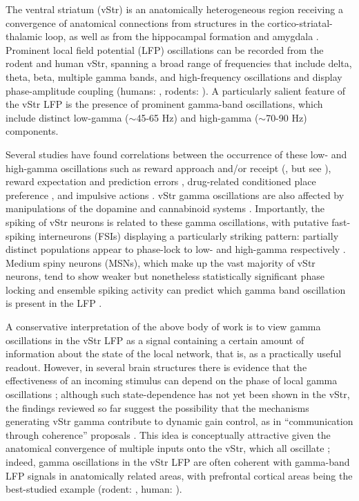 \documentclass[11pt]{article}
\let\cite=\citep
\let\citeNP=\citealt
\begin{document}
The ventral striatum (vStr) is an anatomically heterogeneous region
receiving a convergence of anatomical connections from structures in
the cortico-striatal-thalamic loop, as well as from the hippocampal
formation and amygdala
\cite{Pennartz94,Haber2009,Sesack2010}. Prominent local field
potential (LFP) oscillations can be recorded from the rodent and human
vStr, spanning a broad range of frequencies that include delta, theta,
beta, multiple gamma bands, and high-frequency oscillations
\cite{Berke2004a,VanderMeer2010b,Axmacher2010,Durschmid2013,Hunt2009a}
and display phase-amplitude coupling (humans: \citeNP{Cohen2009f},
rodents: \citeNP{Donnelly2014,Malhotra2015a}). A particularly salient
feature of the vStr LFP is the presence of prominent gamma-band
oscillations, which include distinct low-gamma ($\sim$45-65 Hz) and
high-gamma ($\sim$70-90 Hz) components.

Several studies have found correlations between the occurrence of
these low- and high-gamma oscillations such as reward approach and/or
receipt (\citeNP{Vandermeer2009a,Berke2009b}, but see
\citeNP{Malhotra2015a}), reward expectation and prediction errors
\cite{Cohen2009f,Axmacher2010}, drug-related conditioned place
preference \cite{Dejean2016}, and impulsive actions
\cite{Donnelly2014}. vStr gamma oscillations are also affected by
manipulations of the dopamine and cannabinoid systems
\cite{Berke2009b,Lemaire2012, Morra2012}. Importantly, the spiking of
vStr neurons is related to these gamma oscillations, with putative
fast-spiking interneurons (FSIs) displaying a particularly striking
pattern: partially distinct populations appear to phase-lock to low-
and high-gamma respectively \cite{Berke2005,Vandermeer2009a,
  Dejean2016}. Medium spiny neurons (MSNs), which make up the vast
majority of vStr neurons, tend to show weaker but nonetheless
statistically significant phase locking \cite{Kalenscher2010,Howe2011}
and ensemble spiking activity can predict which gamma band oscillation
is present in the LFP \cite{Catanese2016}.

 A conservative interpretation of the above body of work is to view
 gamma oscillations in the vStr LFP as a signal containing a certain
 amount of information about the state of the local network, that is,
 as a practically useful readout. However, in several brain structures
 there is evidence that the effectiveness of an incoming stimulus can
 depend on the phase of local gamma oscillations
 \cite{Cardin2009,Sohal2009}; although such state-dependence has not
 yet been shown in the vStr, the findings reviewed so far suggest the
 possibility that the mechanisms generating vStr gamma contribute to
 dynamic gain control, as in ``communication through coherence''
 proposals \cite{Akam2010,Womelsdorf2014,Fries2015}. This idea is
 conceptually attractive given the anatomical convergence of multiple
 inputs onto the vStr, which all oscillate
 \cite{Odonnell1995,Gruber2009,Harris2015}; indeed, gamma oscillations
 in the vStr LFP are often coherent with gamma-band LFP signals in
 anatomically related areas, with prefrontal cortical areas being the
 best-studied example (rodent:
 \citeNP{Berke2009b,McCracken2009,Dejean2013,Catanese2016}, human:
 \citeNP{Cohen2009d}).
\end{document}
